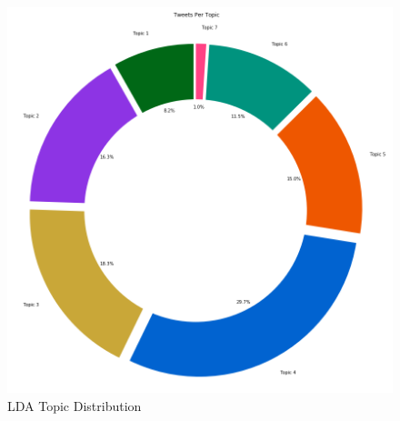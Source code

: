 \begin{singlespacing}
    \begin{figure}[H]
    \centering
    \includegraphics[scale=0.2]{Figures/topic_distribution}
    \caption[LDA Topic Distribution]{LDA Topic Distribution}
    \label{fig:topic_distribution}
    \end{figure}
\end{singlespacing}



